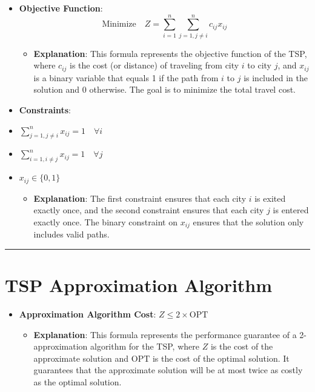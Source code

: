 \documentclass[
  letterpaper,
  DIV=11,
  numbers=noendperiod]{scrreprt}
\providecommand{\tightlist}{%
  \setlength{\itemsep}{0pt}\setlength{\parskip}{0pt}}\usepackage{longtable,booktabs,array}
\begin{document}
\begin{itemize}
\item
  \textbf{Objective Function}: \[
  \text{Minimize} \quad Z = \sum_{i=1}^{n} \sum_{j=1, j \neq i}^{n} c_{ij} x_{ij}
   \]

  \begin{itemize}
  \tightlist
  \item
    \textbf{Explanation}: This formula represents the objective function
    of the TSP, where \(c_{ij}\) is the cost (or distance) of traveling
    from city \(i\) to city \(j\), and \(x_{ij}\) is a binary variable
    that equals 1 if the path from \(i\) to \(j\) is included in the
    solution and 0 otherwise. The goal is to minimize the total travel
    cost.
  \end{itemize}
\item
  \textbf{Constraints}:
\item
  \(\sum_{j=1, j \neq i}^{n} x_{ij} = 1 \quad \forall i\)
\item
  \(\sum_{i=1, i \neq j}^{n} x_{ij} = 1 \quad \forall j\)
\item
  \(x_{ij} \in \{0, 1\}\)

  \begin{itemize}
  \tightlist
  \item
    \textbf{Explanation}: The first constraint ensures that each city
    \(i\) is exited exactly once, and the second constraint ensures that
    each city \(j\) is entered exactly once. The binary constraint on
    \(x_{ij}\) ensures that the solution only includes valid paths.
  \end{itemize}
\end{itemize}

\begin{center}\rule{0.5\linewidth}{0.5pt}\end{center}

\section{TSP Approximation Algorithm}\label{tsp-approximation-algorithm}

\begin{itemize}
\item
  \textbf{Approximation Algorithm Cost}: \(Z \leq 2 \times \text{OPT}\)

  \begin{itemize}
  \tightlist
  \item
    \textbf{Explanation}: This formula represents the performance
    guarantee of a 2-approximation algorithm for the TSP, where \(Z\) is
    the cost of the approximate solution and \(\text{OPT}\) is the cost
    of the optimal solution. It guarantees that the approximate solution
    will be at most twice as costly as the optimal solution.
  \end{itemize}
\end{itemize}
\end{document}
